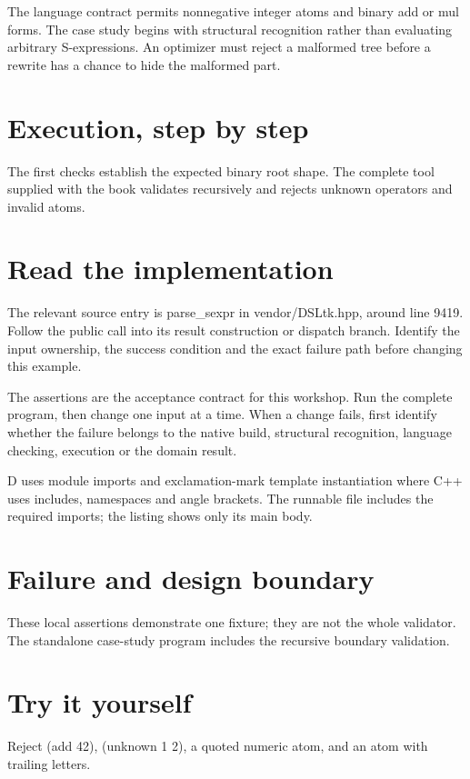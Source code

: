 \clearpage
{}
The language contract permits nonnegative integer atoms and binary add or mul forms. The case study begins with structural recognition rather than evaluating arbitrary S-expressions. An optimizer must reject a malformed tree before a rewrite has a chance to hide the malformed part.


\section*{Execution, step by step}
The first checks establish the expected binary root shape. The complete tool supplied with the book validates recursively and rejects unknown operators and invalid atoms.

\section*{Read the implementation}
The relevant source entry is parse\_sexpr in vendor/DSLtk.hpp, around line 9419. Follow the public call into its result construction or dispatch branch. Identify the input ownership, the success condition and the exact failure path before changing this example.

The assertions are the acceptance contract for this workshop. Run the complete program, then change one input at a time. When a change fails, first identify whether the failure belongs to the native build, structural recognition, language checking, execution or the domain result.

\clearpage
{}
D uses module imports and exclamation-mark template instantiation where C++ uses includes, namespaces and angle brackets. The runnable file includes the required imports; the listing shows only its main body.


\section*{Failure and design boundary}
These local assertions demonstrate one fixture; they are not the whole validator. The standalone case-study program includes the recursive boundary validation.

\section*{Try it yourself}
Reject (add 42), (unknown 1 2), a quoted numeric atom, and an atom with trailing letters.


